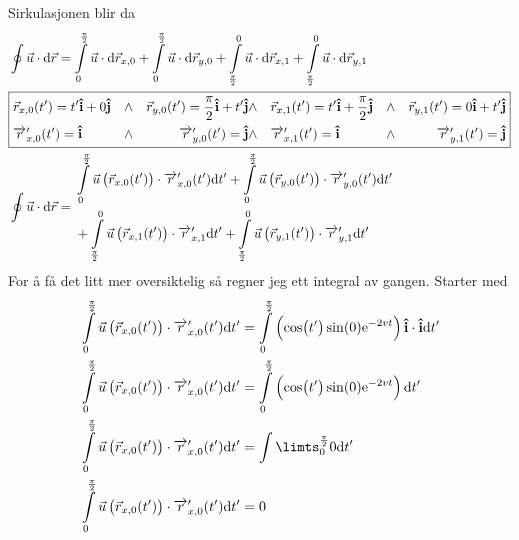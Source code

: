 \documentclass[a4paper,10pt,norsk]{article}
\newcommand{\dd}[1]{\mathrm{d}#1}
\newcommand{\uvec}[1]{\boldsymbol{\hat{\textbf{#1}}}}
\begin{document}
		Sirkulasjonen blir da
		\begin{align*}
			&\oint \vec{u}  \cdot \dd{\vec{r} } = \int\limits_0^{\frac{\pi}{2}} \vec{u} \cdot \dd{\vec{r}_{x,0} } + \int\limits_0^{\frac{\pi}{2}} \vec{u} \cdot \dd{\vec{r}_{y,0} }+  \int\limits_{\frac{\pi}{2}}^0 \vec{u} \cdot \dd{\vec{r}_{x,1} } + \int\limits_{\frac{\pi}{2}}^0 \vec{u} \cdot  \dd{\vec{r}_{y,1} }\\
			&\boxed{%
				\begin{aligned}
				&\vec{r}_{x,0}(t') = t' \uvec{i} + 0 \uvec{j} &\wedge&  &\vec{r}_{y,0}(t') = \frac{\pi}{2} \uvec{i} + t' \uvec{j} 
				&\wedge&  &\vec{r}_{x,1}(t') = t' \uvec{i} + \frac{\pi}{2}\uvec{j} &\wedge & &\vec{r}_{y,1}(t') = 0 \uvec{i} + t' \uvec{j}\\
				&\overrightarrow{r}'_{x,0}(t') = \uvec{i} &\wedge & &\overrightarrow{r}'_{y,0}(t') = \uvec{j}
				&\wedge & & \overrightarrow{r}'_{x,1}(t') = \uvec{i} &\wedge & & \overrightarrow{r}_{y,1}^{\prime} (t') = \uvec{j}
			\end{aligned}}\\
			&\oint \vec{u}  \cdot \dd{\vec{r} } =  
			\begin{aligned}
				&\int\limits_0^{\frac{\pi}{2}} \vec{u} \left( \vec{r}_{x,0}(t')  \right) \cdot \overrightarrow{r}'_{x,0}(t') \dd{t'} 
				+ \int\limits_0^{\frac{\pi}{2}} \vec{u} \left( \vec{r}_{y,0}(t')  \right) \cdot \overrightarrow{r}'_{y,0}(t') \dd{t'}\\
				&+ \int\limits_{\frac{\pi}{2}}^0 \vec{u} \left( \vec{r}_{x,1}(t') \right) \cdot \overrightarrow{r}'_{x,1} \dd{t'}
				+\int\limits_{\frac{\pi}{2}}^0 \vec{u} \left( \vec{r}_{y,1}(t') \right) \cdot \overrightarrow{r}'_{y,1} \dd{t'}\\
			\end{aligned}
		\end{align*}
		For å få det litt mer oversiktelig så regner jeg ett integral av gangen. Starter med
		\begin{align*}
			&\int\limits_0^{\frac{\pi}{2}} \vec{u} \left( \vec{r}_{x,0}(t')  \right) \cdot \overrightarrow{r}'_{x,0}(t') \dd{t'} = 
			\int\limits_0^{\frac{\pi}{2}} \left( \cos(t')\sin(0) \mathrm{e}^{-2vt}  \right) \uvec{i}\cdot \uvec{i} \dd{t'}\\
			&\int\limits_0^{\frac{\pi}{2}} \vec{u} \left( \vec{r}_{x,0}(t')  \right) \cdot \overrightarrow{r}'_{x,0}(t') \dd{t'} = 
			\int\limits_0^{\frac{\pi}{2}} \left( \cos(t')\sin(0) \mathrm{e}^{-2vt}   \right) \dd{t'}\\
			&\int\limits_0^{\frac{\pi}{2}} \vec{u} \left( \vec{r}_{x,0}(t')  \right) \cdot \overrightarrow{r}'_{x,0}(t') \dd{t'} =
			\int\limts_0^{\frac{\pi}{2}} 0 \dd{t'}\\
			&\int\limits_0^{\frac{\pi}{2}} \vec{u} \left( \vec{r}_{x,0}(t')  \right) \cdot \overrightarrow{r}'_{x,0}(t') \dd{t'} = 0
		\end{align*}
\end{document}
